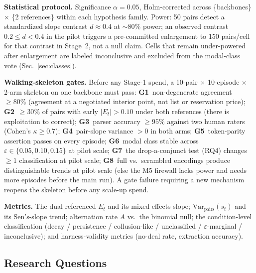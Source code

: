 \documentclass[conference]{IEEEtran}
\newcommand{\Et}{E_t}
\newcommand{\eps}{\varepsilon}
\begin{document}
\textbf{Statistical protocol.} Significance $\alpha = 0.05$, Holm-corrected
across \{backbones\} $\times$ \{2 references\} within each hypothesis family.
Power: 50 pairs detect a standardized slope contrast $d \approx 0.4$ at
$\sim$80\% power; an observed contrast $0.2 \leq d < 0.4$ in the pilot
triggers a pre-committed enlargement to 150 pairs/cell for that contrast in
Stage~2, not a null claim. Cells that remain under-powered after enlargement
are labeled inconclusive and excluded from the modal-class vote
(Sec.~\ref{sec:classes}).

\textbf{Walking-skeleton gates.} Before any Stage-1 spend, a 10-pair
$\times$ 10-episode $\times$ 2-arm skeleton on one backbone must pass:
\textbf{G1}~non-degenerate agreement $\geq 80\%$ (agreement at a negotiated
interior point, not list or reservation price); \textbf{G2}~$\geq 30\%$ of
pairs with early $|\Et| > 0.10$ under both references (there is exploitation
to correct); \textbf{G3}~parser accuracy $\geq 95\%$ against two human raters
(Cohen's $\kappa \geq 0.7$); \textbf{G4}~pair-slope variance $> 0$ in both
arms; \textbf{G5}~token-parity assertion passes on every episode;
\textbf{G6}~modal class stable across $\eps \in \{0.05, 0.10, 0.15\}$ at
pilot scale; \textbf{G7}~the drop-a-conjunct test (RQ4) changes $\geq 1$
classification at pilot scale; \textbf{G8}~full vs.\ scrambled encodings
produce distinguishable trends at pilot scale (else the M5 firewall lacks
power and needs more episodes before the main run). A gate failure requiring
a new mechanism reopens the skeleton before any scale-up spend.

\textbf{Metrics.} The dual-referenced $\Et$ and its mixed-effects slope;
$\mathrm{Var}_{\mathrm{pairs}}(s_t)$ and its Sen's-slope trend; alternation
rate $A$ vs.\ the binomial null; the condition-level classification (decay /
persistence / collusion-like / unclassified / $\eps$-marginal /
inconclusive); and harness-validity metrics (no-deal rate, extraction
accuracy).

\subsection{Research Questions}
\end{document}
